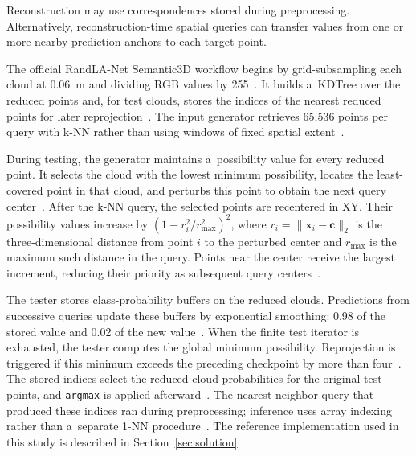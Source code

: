 Reconstruction may use correspondences stored during preprocessing. Alternatively, reconstruction-time spatial queries can transfer values from one or more nearby prediction anchors to each target point.

The official RandLA-Net Semantic3D workflow begins by grid-subsampling each cloud at 0.06~m and dividing RGB values by 255~\citep{randla-preprocess}. It builds a~KDTree over the reduced points and, for test clouds, stores the indices of the nearest reduced points for later reprojection~\citep{randla-preprocess}. The input generator retrieves 65,536 points per query with k-NN rather than using windows of fixed spatial extent~\citep{randla-config,randla-dataset}.

During testing, the generator maintains a~possibility value for every reduced point. It selects the cloud with the lowest minimum possibility, locates the least-covered point in that cloud, and perturbs this point to obtain the next query center~\citep{randla-dataset}. After the k-NN query, the selected points are recentered in XY. Their possibility values increase by $(1-r_i^2/r_{\max}^2)^2$, where $r_i=\lVert\mathbf{x}_i-\mathbf{c}\rVert_2$ is the three-dimensional distance from point $i$ to the perturbed center and $r_{\max}$ is the maximum such distance in the query. Points near the center receive the largest increment, reducing their priority as subsequent query centers~\citep{randla-dataset}.

The tester stores class-probability buffers on the reduced clouds. Predictions from successive queries update these buffers by exponential smoothing: 0.98 of the stored value and 0.02 of the new value~\citep{randla-tester}. When the finite test iterator is exhausted, the tester computes the global minimum possibility. Reprojection is triggered if this minimum exceeds the preceding checkpoint by more than four~\citep{randla-tester}. The stored indices select the reduced-cloud probabilities for the original test points, and \texttt{argmax} is applied afterward~\citep{randla-preprocess,randla-tester}. The nearest-neighbor query that produced these indices ran during preprocessing; inference uses array indexing rather than a~separate 1-NN procedure~\citep{randla-preprocess,randla-tester}. The reference implementation used in this study is described in Section~\ref{sec:solution}.
